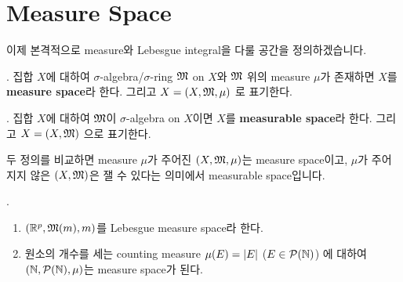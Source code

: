 \section*{Measure Space}

이제 본격적으로 measure와 Lebesgue integral을 다룰 공간을 정의하겠습니다.

.  집합 \(X\)에 대하여 \(\sigma\)-algebra/\(\sigma\)-ring \(\mathfrak{M}\) on \(X\)와 \(\mathfrak{M}\) 위의 measure \(\mu\)가 존재하면 \(X\)를 \textbf{measure space}라 한다. 그리고 \(X = (X, \mathfrak{M}, \mu)\) 로 표기한다.

.  집합 \(X\)에 대하여 \(\mathfrak{M}\)이 \(\sigma\)-algebra on \(X\)이면 \(X\)를 \textbf{measurable space}라 한다. 그리고 \(X = (X, \mathfrak{M})\) 으로 표기한다.

두 정의를 비교하면 measure \(\mu\)가 주어진 \((X, \mathfrak{M}, \mu)\)는 measure space이고, \(\mu\)가 주어지지 않은 \((X, \mathfrak{M})\)은 잴 수 있다는 의미에서 measurable space입니다.

\ex.
\begin{enumerate}
    \item \((\mathbb{R}^p, \mathfrak{M}(m), m)\)를 Lebesgue measure space라 한다.
    \item 원소의 개수를 세는 counting measure \(\mu(E) = \left| E \right|\) (\(E \in \mathcal{P}(\mathbb{N})\)) 에 대하여 \((\mathbb{N}, \mathcal{P}(\mathbb{N}), \mu)\)는 measure space가 된다.
\end{enumerate}

\pagebreak
